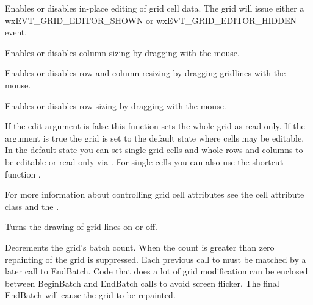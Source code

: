 Enables or disables in-place editing of grid cell data. The grid will issue either a
wxEVT\_GRID\_EDITOR\_SHOWN or wxEVT\_GRID\_EDITOR\_HIDDEN event.

\label{wxgridenabledragcolsize}


Enables or disables column sizing by dragging with the mouse.

\label{wxgridenabledraggridsize}


Enables or disables row and column resizing by dragging gridlines with the mouse.

\label{wxgridenabledragrowsize}


Enables or disables row sizing by dragging with the mouse.

\label{wxgridenableediting}


If the edit argument is false this function sets the whole grid as read-only. If the
argument is true the grid is set to the default state where cells may be editable. In the
default state you can set single grid cells and whole rows and columns to be editable or
read-only via 
. For single
cells you can also use the shortcut function 
. 

For more information about controlling grid cell attributes see the 
 cell attribute class and the 
.

\label{wxgridenablegridlines}


Turns the drawing of grid lines on or off.

\label{wxgridendbatch}


Decrements the grid's batch count. When the count is greater than zero repainting of
the grid is suppressed. Each previous call to 
 must be matched by a later call to
EndBatch. Code that does a lot of grid modification can be enclosed between
BeginBatch and EndBatch calls to avoid screen flicker. The final EndBatch will
cause the grid to be repainted.


